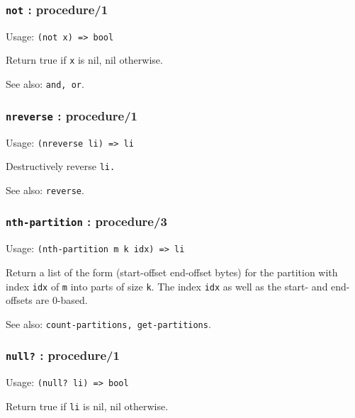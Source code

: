 \documentclass[
]{article}
\newcommand{\passthrough}[1]{#1}
\begin{document}
\hypertarget{not-procedure1}{%
\subsubsection{\texorpdfstring{\texttt{not} :
procedure/1}{not : procedure/1}}\label{not-procedure1}}

Usage: \passthrough{\lstinline!(not x) => bool!}

Return true if \passthrough{\lstinline!x!} is nil, nil otherwise.

See also: \passthrough{\lstinline!and, or!}.

\hypertarget{nreverse-procedure1}{%
\subsubsection{\texorpdfstring{\texttt{nreverse} :
procedure/1}{nreverse : procedure/1}}\label{nreverse-procedure1}}

Usage: \passthrough{\lstinline!(nreverse li) => li!}

Destructively reverse \passthrough{\lstinline!li.!}

See also: \passthrough{\lstinline!reverse!}.

\hypertarget{nth-partition-procedure3}{%
\subsubsection{\texorpdfstring{\texttt{nth-partition} :
procedure/3}{nth-partition : procedure/3}}\label{nth-partition-procedure3}}

Usage: \passthrough{\lstinline!(nth-partition m k idx) => li!}

Return a list of the form (start-offset end-offset bytes) for the
partition with index \passthrough{\lstinline!idx!} of
\passthrough{\lstinline!m!} into parts of size
\passthrough{\lstinline!k!}. The index \passthrough{\lstinline!idx!} as
well as the start- and end-offsets are 0-based.

See also: \passthrough{\lstinline!count-partitions, get-partitions!}.

\hypertarget{null-procedure1}{%
\subsubsection{\texorpdfstring{\texttt{null?} :
procedure/1}{null? : procedure/1}}\label{null-procedure1}}

Usage: \passthrough{\lstinline!(null? li) => bool!}

Return true if \passthrough{\lstinline!li!} is nil, nil otherwise.
\end{document}
